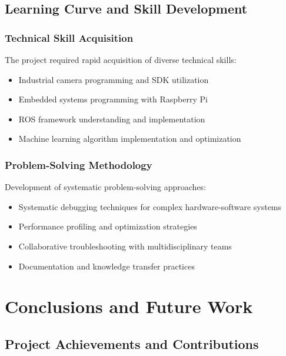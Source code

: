 \documentclass{book}
\begin{document}
\section{Learning Curve and Skill Development}

\subsection{Technical Skill Acquisition}

\par\noindent The project required rapid acquisition of diverse technical skills:

\begin{itemize}
\item Industrial camera programming and SDK utilization
\item Embedded systems programming with Raspberry Pi
\item ROS framework understanding and implementation
\item Machine learning algorithm implementation and optimization
\end{itemize}

\subsection{Problem-Solving Methodology}

\par\noindent Development of systematic problem-solving approaches:

\begin{itemize}
\item Systematic debugging techniques for complex hardware-software systems
\item Performance profiling and optimization strategies
\item Collaborative troubleshooting with multidisciplinary teams
\item Documentation and knowledge transfer practices
\end{itemize}

\chapter{Conclusions and Future Work}

\section{Project Achievements and Contributions}
\end{document}
